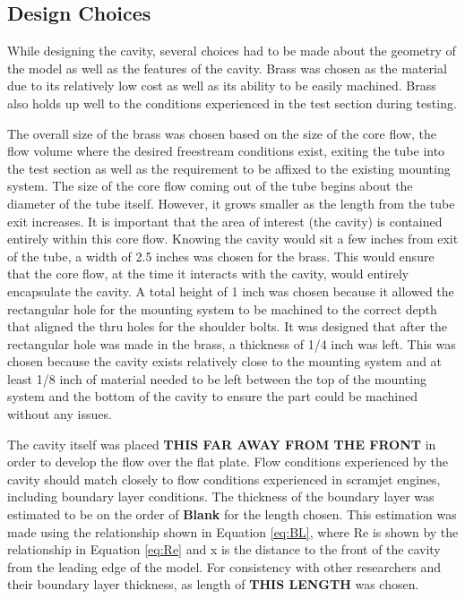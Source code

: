 \subsection{Design Choices}

While designing the cavity, several choices had to be made about the geometry of the model as well as the features of the cavity. Brass was chosen as the material due to its relatively low cost as well as its ability to be easily machined. Brass also holds up well to the conditions experienced in the test section during testing. 

The overall size of the brass was chosen based on the size of the core flow, the flow volume where the desired freestream conditions exist, exiting the tube into the test section as well as the requirement to be affixed to the existing mounting system. The size of the core flow coming out of the tube begins about the diameter of the tube itself. However, it grows smaller as the length from the tube exit increases. It is important that the area of interest (the cavity) is contained entirely within this core flow. Knowing the cavity would sit a few inches from exit of the tube, a width of 2.5 inches was chosen for the brass. This would ensure that the core flow, at the time it interacts with the cavity, would entirely encapsulate the cavity. A total height of 1 inch was chosen because it allowed the rectangular hole for the mounting system to be machined to the correct depth that aligned the thru holes for the shoulder bolts. It was designed that after the rectangular hole was made in the brass, a thickness of 1/4 inch was left. This was chosen because the cavity exists relatively close to the mounting system and at least 1/8 inch of material needed to be left between the top of the mounting system and the bottom of the cavity to ensure the part could be machined without any issues. 

The cavity itself was placed \textbf{THIS FAR AWAY FROM THE FRONT} in order to develop the flow over the flat plate. Flow conditions experienced by the cavity should match closely to flow conditions experienced in scramjet engines, including boundary layer conditions. The thickness of the boundary layer was estimated to be on the order of \textbf{Blank} for the length chosen. This estimation was made using the relationship shown in Equation \ref{eq:BL}, where Re is shown by the relationship in Equation \ref{eq:Re} and x is the distance to the front of the cavity from the leading edge of the model. For consistency with other researchers and their boundary layer thickness, as length of \textbf{THIS LENGTH} was chosen.

